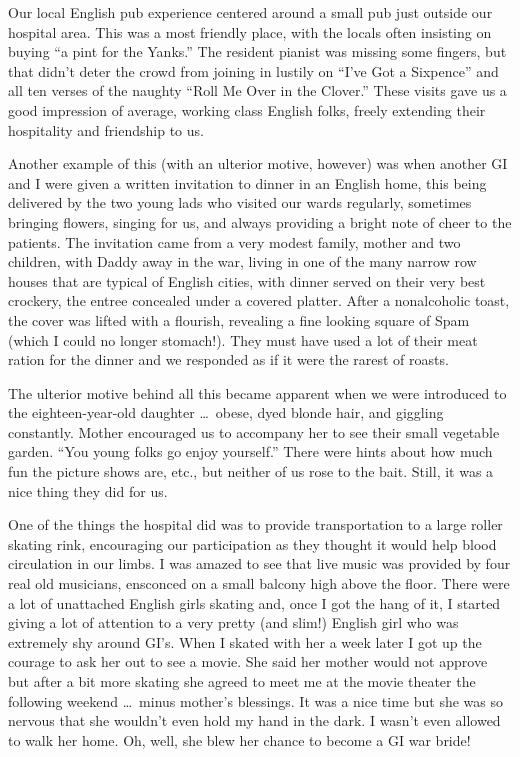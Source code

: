 \documentclass[../m3y]{subfiles}
\begin{document}
Our local English pub experience centered around a small pub just outside our hospital area. This was a most friendly place, with the locals often insisting on buying ``a pint for the Yanks.'' The resident pianist was missing some fingers, but that didn't deter the crowd from joining in lustily on ``I've Got a Sixpence'' and all ten verses of the naughty ``Roll Me Over in the Clover.'' These visits gave us a good impression of average, working class English folks, freely extending their hospitality and friendship to us.

Another example of this (with an ulterior motive, however) was when another GI and I were given a written invitation to dinner in an English home, this being delivered by the two young lads who visited our wards regularly, sometimes bringing flowers, singing for us, and always providing a bright note of cheer to the patients. The invitation came from a very modest family, mother and two children, with Daddy away in the war, living in one of the many narrow row houses that are typical of English cities, with dinner served on their very best crockery, the entree concealed under a covered platter. After a nonalcoholic toast, the cover was lifted with a flourish, revealing a fine looking square of Spam (which I could no longer stomach!). They must have used a lot of their meat ration for the dinner and we responded as if it were the rarest of roasts.

The ulterior motive behind all this became apparent when we were introduced to the eighteen-year-old daughter \ldots\ obese, dyed blonde hair, and giggling constantly. Mother encouraged us to accompany her to see their small vegetable garden. ``You young folks go enjoy yourself.'' There were hints about how much fun the picture shows are, etc.\@, but neither of us rose to the bait. Still, it was a nice thing they did for us.

One of the things the hospital did was to provide transportation to a large roller skating rink, encouraging our participation as they thought it would help blood circulation in our limbs. I was amazed to see that live music was provided by four real old musicians, ensconced on a small balcony high above the floor. There were a lot of unattached English girls skating and, once I got the hang of it, I started giving a lot of attention to a very pretty (and slim!) English girl who was extremely shy around GI's. When I skated with her a week later I got up the courage to ask her out to see a movie. She said her mother would not approve but after a bit more skating she agreed to meet me at the movie theater the following weekend \ldots\ minus mother's blessings. It was a nice time but she was so nervous that she wouldn't even hold my hand in the dark. I wasn't even allowed to walk her home. Oh, well, she blew her chance to become a GI war bride!
\end{document}

